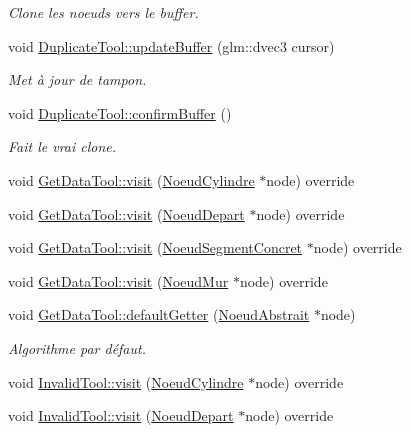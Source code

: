 \begin{DoxyCompactItemize}
\begin{DoxyCompactList}\small\item\em Clone les noeuds vers le buffer. \end{DoxyCompactList}\item 
void \hyperlink{group__inf2990_ga2fad36673e41afac22177ca37c6c75ff}{Duplicate\-Tool\-::update\-Buffer} (glm\-::dvec3 cursor)
\begin{DoxyCompactList}\small\item\em Met à jour de tampon. \end{DoxyCompactList}\item 
void \hyperlink{group__inf2990_ga69fcbb20577c85049ca9a5ca8b37091d}{Duplicate\-Tool\-::confirm\-Buffer} ()
\begin{DoxyCompactList}\small\item\em Fait le vrai clone. \end{DoxyCompactList}\item 
void \hyperlink{group__inf2990_ga21292ea905abc9e5c85d04e4ca9b6863}{Get\-Data\-Tool\-::visit} (\hyperlink{class_noeud_cylindre}{Noeud\-Cylindre} $\ast$node) override
\item 
void \hyperlink{group__inf2990_ga4ce08dbc70076e50ec519cd082a9e1ad}{Get\-Data\-Tool\-::visit} (\hyperlink{class_noeud_depart}{Noeud\-Depart} $\ast$node) override
\item 
void \hyperlink{group__inf2990_gae3edeae69aab08455d88459437c1c941}{Get\-Data\-Tool\-::visit} (\hyperlink{class_noeud_segment_concret}{Noeud\-Segment\-Concret} $\ast$node) override
\item 
void \hyperlink{group__inf2990_ga9db0192f32035edd1e4b8c2858feb5d1}{Get\-Data\-Tool\-::visit} (\hyperlink{class_noeud_mur}{Noeud\-Mur} $\ast$node) override
\item 
void \hyperlink{group__inf2990_gab96d72787632de185fd46dee5d8b9750}{Get\-Data\-Tool\-::default\-Getter} (\hyperlink{class_noeud_abstrait}{Noeud\-Abstrait} $\ast$node)
\begin{DoxyCompactList}\small\item\em Algorithme par défaut. \end{DoxyCompactList}\item 
void \hyperlink{group__inf2990_ga55674ebdcf4c31ced5df732e2424d282}{Invalid\-Tool\-::visit} (\hyperlink{class_noeud_cylindre}{Noeud\-Cylindre} $\ast$node) override
\item 
void \hyperlink{group__inf2990_gabbc70a0da4b0aadac5a37f1fce30cb7a}{Invalid\-Tool\-::visit} (\hyperlink{class_noeud_depart}{Noeud\-Depart} $\ast$node) override

\end{DoxyCompactItemize}
